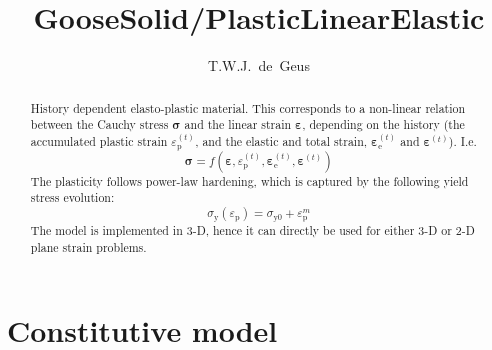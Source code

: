\documentclass[times,namecite]{goose-article}
\title{%
  GooseSolid/PlasticLinearElastic
}
\author{T.W.J.~de~Geus}
\begin{document}
\maketitle

\begin{abstract}
History dependent elasto-plastic material. This corresponds to a non-linear relation between the Cauchy stress $\bm{\sigma}$ and the linear strain $\bm{\varepsilon}$, depending on the history (the accumulated plastic strain $\varepsilon_\mathrm{p}^{(t)}$, and the elastic and total strain, $\bm{\varepsilon}^{(t)}_\mathrm{e}$ and $\bm{\varepsilon}^{(t)}$). I.e.
\begin{equation*}
  \bm{\sigma} = f \left( \bm{\varepsilon} , \varepsilon_\mathrm{p}^{(t)} , \bm{\varepsilon}^{(t)}_\mathrm{e} ,\bm{\varepsilon}^{(t)} \right)
\end{equation*}
The plasticity follows power-law hardening, which is captured by the following yield stress evolution:
\begin{equation*}
  \sigma_\mathrm{y} (\varepsilon_\mathrm{p})
  = \sigma_\mathrm{y0} + \varepsilon_\mathrm{p}^m
\end{equation*}
The model is implemented in 3-D, hence it can directly be used for either 3-D or 2-D plane strain problems.
\end{abstract}


\setcounter{tocdepth}{2}
\tableofcontents

\vfill\newpage
\section{Constitutive model}
\end{document}
